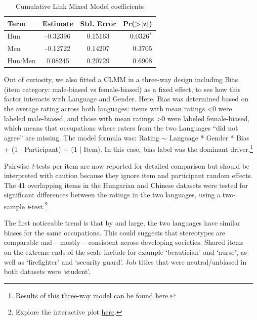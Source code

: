 \documentclass[10pt, a4paper]{article}
\begin{document}

\begin{table}[ht]
  \centering
  \begin{tabular}{@{}lccr@{}}
    \toprule
    \textbf{Term} & \textbf{Estimate} & \textbf{Std. Error} & \textbf{Pr(>|z|)} \\
    \midrule
    Hun      & -0.32396 & 0.15163 & 0.0326$^{*}$ \\
    Men     & -0.12722 & 0.14207 & 0.3705 \\
    Hun:Men &  0.08245 & 0.20729 & 0.6908 \\
    \bottomrule
  \end{tabular}
  \label{tab:clmm_coeffs}
  \caption{Cumulative Link Mixed Model coefficients}
\end{table}

Out of curiosity, we also fitted a CLMM in a three-way design including Bias (item category: male-biased vs female-biased) as a fixed effect, to see how this factor interacts with Language and Gender. Here, Bias was determined based on the average rating across both languages: items with mean ratings <0 were labeled male-biased, and those with mean ratings >0 were labeled female-biased, which means that occupations where raters from the two Languages ``did not agree'' are missing. The model formula was: Rating $\sim$ Language * Gender * Bias + (1 | Participant) + (1 | Item). In this case, bias label was the dominant driver.\footnote{Results of this three-way model can be found \href{https://anonymous.4open.science/r/occupational-gender-bias/clmm_with_bias_results.txt}{here}.}

Pairwise \textit{t}-tests per item are now reported for detailed comparison but should be interpreted with caution because they ignore item and participant random effects. The 41 overlapping items in the Hungarian and Chinese datasets were tested for significant differences between the ratings in the two languages, using a two-sample \textit{t}-test.\footnote{Explore the interactive plot \href{https://anonymous.4open.science/api/repo/occupational-gender-bias/file/occupations_comparison.html?v=206e754e}{here}.} 


The first noticeable trend is that by and large, the two languages have similar biases for the same occupations. This could suggests that stereotypes are comparable and -- mostly -- consistent across developing societies. Shared items on the extreme ends of the scale include for example `beautician' and `nurse', as well as `firefighter' and `security guard'. Job titles that were neutral/unbiased in both datasets were `student'.
\end{document}
